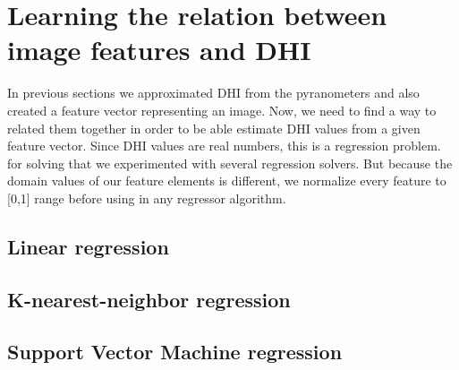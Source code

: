 \section{Learning the relation between image features and DHI}
In previous sections we approximated DHI from the pyranometers and also created a feature vector representing an image. Now, we need to find a way to related them together in order to be able estimate DHI values from a given feature vector. Since DHI values are real numbers, this is a regression problem. for solving that we experimented with several regression solvers. But because the domain values of our feature elements is different, we normalize every feature to [0,1] range before using in any regressor algorithm. 

\subsection{Linear regression}

\subsection{K-nearest-neighbor regression}


\subsection{Support Vector Machine regression}



